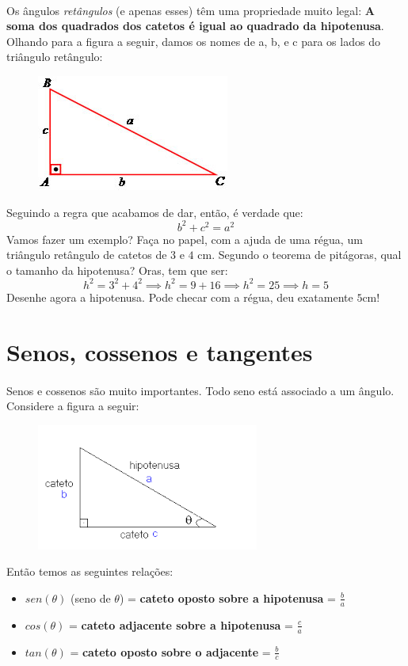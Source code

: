 \documentclass[11pt]{article}
\begin{document}
\paragraph{}
Os ângulos \emph{retângulos} (e apenas esses) têm uma propriedade muito legal:
\textbf{A soma dos quadrados dos catetos é igual ao quadrado da hipotenusa}.
Olhando para a figura a seguir, damos os nomes de a, b, e c para os lados 
do triângulo retângulo:
\begin{figure}[H]
	\centering
	\includegraphics[width=0.5\linewidth]{imgs/trig_ret.jpg}
\end{figure}
Seguindo a regra que acabamos de dar, então, é verdade que:
$$b^2 + c^2 = a^2$$
Vamos fazer um exemplo? Faça no papel, com a ajuda de uma régua, um triângulo 
retângulo de catetos de $3$ e $4$ cm. Segundo o teorema de pitágoras, qual
o tamanho da hipotenusa? Oras, tem que ser:
$$h^2 = 3^2 + 4^2 \implies h^2 = 9 + 16 \implies h^2 = 25 \implies h = 5$$
Desenhe agora a hipotenusa. Pode checar com a régua, deu exatamente $5$cm!

\section{Senos, cossenos e tangentes}
\paragraph{}
Senos e cossenos são muito importantes. Todo seno está associado a um ângulo.
Considere a figura a seguir:
\begin{figure}[H]
	\centering
	\includegraphics[width=0.5\linewidth]{imgs/seno.png}
\end{figure}
Então temos as seguintes relações:
\begin{itemize}
	\item $sen(\theta)$ (seno de $\theta$) = 
		\textbf{cateto oposto sobre a hipotenusa} = $\frac{b}{a}$
	\item $cos(\theta)$ = 
		\textbf{cateto adjacente sobre a hipotenusa} = $\frac{c}{a}$
	\item $tan(\theta)$ = 
		\textbf{cateto oposto sobre o adjacente} = $\frac{b}{c}$
\end{itemize}
\end{document}
